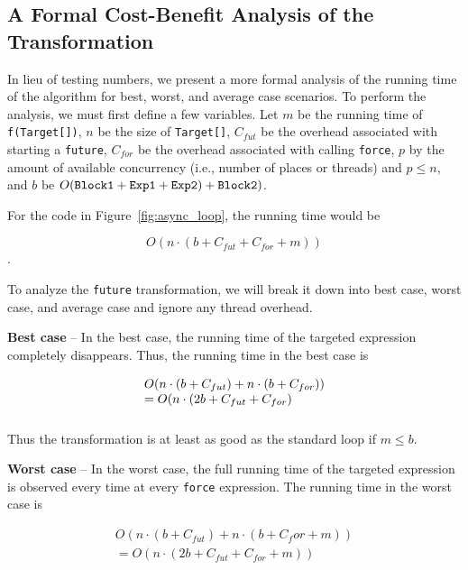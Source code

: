 \subsection{A Formal Cost-Benefit Analysis of the Transformation}

In lieu of testing numbers, we present a more formal analysis of the
running time of the algorithm for best, worst, and average case scenarios. To
perform the analysis, we must first define a few variables. Let $m$ be the running time of
{\tt f(Target[])}, $n$ be the size of {\tt Target[]}, $C_{fut}$ be the overhead associated with starting a {\tt future}, $C_{for}$ be the overhead associated with calling {\tt force}, $p$ by the amount of available concurrency (i.e., number of
places or threads) and $p \leq n$, and $b$ be $O({\tt Block1}+{\tt
Exp1}+{\tt Exp2})+{\tt Block2})$.

For the code in Figure~\ref{fig:async_loop}, the running time would be

\vspace{-.1in}
\[O(n \cdot (b + C_{fut} + C_{for} + m))\].
\vspace{-.2in}

To analyze the {\tt future} transformation, we will break it down into
best case, worst case, and average case and ignore any thread overhead.

{\bf Best case} -- In the best case, the running time of the targeted
expression completely disappears. Thus, the running time in the best case is 

\vspace{-.1in}
\[\begin{array}{l}
O(n \cdot (b+C_{fut}) + n \cdot (b+C_{for})) \\ 
\vspace{.1in}
= O(n \cdot (2b + C_{fut} + C_{for})
\end{array}\]
\vspace{-.25in}

Thus the transformation is at least as good as the standard loop if $m
\leq b$.

{\bf Worst case} -- In the worst case, the full running time of the targeted
expression is observed every time at every {\tt force} expression. The running
time in the worst case is

\vspace{-.1in}
\[\begin{array}{l}
O(n \cdot (b+C_{fut}) + n \cdot (b+{C_for}+m)) \\
= O(n \cdot (2b + C_{fut} + C_{for} + m))
\end{array}\]
\vspace{-.15in}

